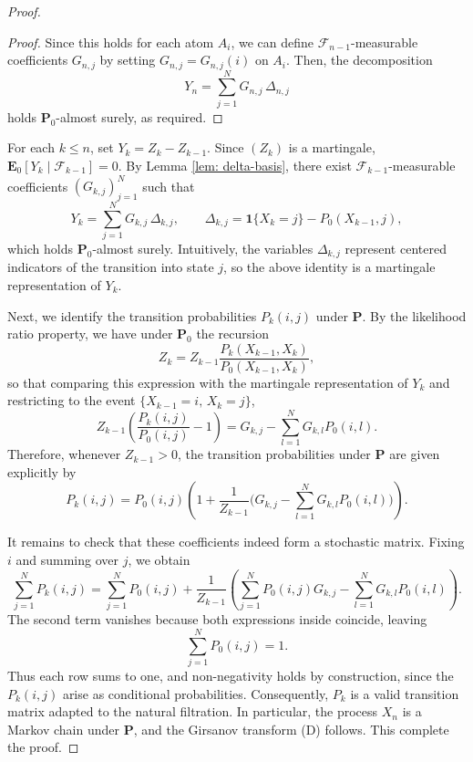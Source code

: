 \documentclass[10pt,a4paper]{amsart}
\begin{document}
\begin{proof}
\begin{proof}
Since this holds for each atom \( A_i \), we can define \( \mathscr{F}_{n-1} \)-measurable coefficients \( G_{n,j} \) by setting \( G_{n,j} = G_{n,j}(i) \) on \( A_i \). Then, the decomposition
\[Y_n = \sum_{j=1}^N G_{n,j} \, \Delta_{n,j}\]
holds \( \mathbf{P}_0 \)-almost surely, as required.
\end{proof}

For each $k \leq n$, set $Y_k = Z_k - Z_{k-1}$. Since $(Z_k)$ is a martingale, $\mathbf{E}_0[Y_k \mid \mathscr{F}_{k-1}] = 0$. By Lemma \ref{lem: delta-basis}, there exist $\mathscr{F}_{k-1}$-measurable coefficients $(G_{k,j})_{j=1}^N$ such that
$$Y_k = \sum_{j=1}^N G_{k,j}\,\Delta_{k,j}, 
\qquad \Delta_{k,j} = \mathbf{1}{\{X_k=j\}} - P_0(X_{k-1},j),$$
which holds $\mathbf P_0$-almost surely. Intuitively, the variables $\Delta_{k,j}$ represent centered indicators of the transition into state $j$, so the above identity is a martingale representation of $Y_k$. 

Next, we identify the transition probabilities $P_k(i,j)$ under $\mathbf P$. By the likelihood ratio property, we have under $\mathbf P_0$ the recursion
$$Z_k = Z_{k-1}\frac{P_{k}(X_{k-1},X_k)}{P_0(X_{k-1},X_k)},$$
so that comparing this expression with the martingale representation of $Y_k$ and restricting to the event $\{X_{k-1}=i,\,X_k=j\}$,
$$Z_{k-1}\!\left(\frac{P_{k}(i,j)}{P_0(i,j)}-1\right) = G_{k,j} - \sum_{l=1}^N G_{k,l}P_0(i,l).$$
Therefore, whenever $Z_{k-1}>0$, the transition probabilities under $\mathbf P$ are given explicitly by
$$P_{k}(i,j) = P_0(i,j)\left(1+\frac{1}{Z_{k-1}}\Big(G_{k,j}-\sum_{l=1}^N G_{k,l}P_0(i,l)\Big)\right).$$

It remains to check that these coefficients indeed form a stochastic matrix. Fixing $i$ and summing over $j$, we obtain
$$
\sum_{j=1}^N P_{k}(i,j)
= \sum_{j=1}^N P_0(i,j) 
+ \frac{1}{Z_{k-1}}\!\left(\sum_{j=1}^N P_0(i,j)G_{k,j} - \sum_{l=1}^N G_{k,l}P_0(i,l)\right).
$$
The second term vanishes because both expressions inside coincide, leaving
$$\sum_{j=1}^N P_0(i,j)  = 1.$$
Thus each row sums to one, and non-negativity holds by construction, since the $P_k(i,j)$ arise as conditional probabilities. Consequently, $P_k$ is a valid transition matrix adapted to the natural filtration. In particular, the process $X_n$ is a Markov chain under $\mathbf{P}$, and the Girsanov transform (D) follows.  This complete the proof.  \end{proof}
\end{document}
